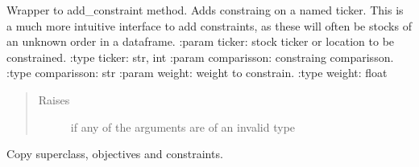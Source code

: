 \documentclass[letterpaper,10pt,english]{sphinxmanual}
\begin{document}
\begin{fulllineitems}

\begin{fulllineitems}
\label{\detokenize{dalio.model:dalio.model.financial.MakeEfficientFrontier.add_stock_weight_constraint}}
Wrapper to add\_constraint method. Adds constraing on a named
ticker.
This is a much more intuitive interface to add constraints, as these
will often be stocks of an unknown order in a dataframe.
:param ticker: stock ticker or location to be constrained.
:type ticker: str, int
:param comparisson: constraing comparisson.
:type comparisson: str
:param weight: weight to constrain.
:type weight: float
\begin{quote}\begin{description}
\item[{Raises}] \leavevmode
{} \textendash{} if any of the arguments are of an invalid type

\end{description}\end{quote}

\end{fulllineitems}


\begin{fulllineitems}
\label{\detokenize{dalio.model:dalio.model.financial.MakeEfficientFrontier.copy}}
Copy superclass, objectives and constraints.

\end{fulllineitems}


\begin{fulllineitems}
\label{\detokenize{dalio.model:dalio.model.financial.MakeEfficientFrontier.gamma}}
\end{fulllineitems}


\end{fulllineitems}
\end{document}
